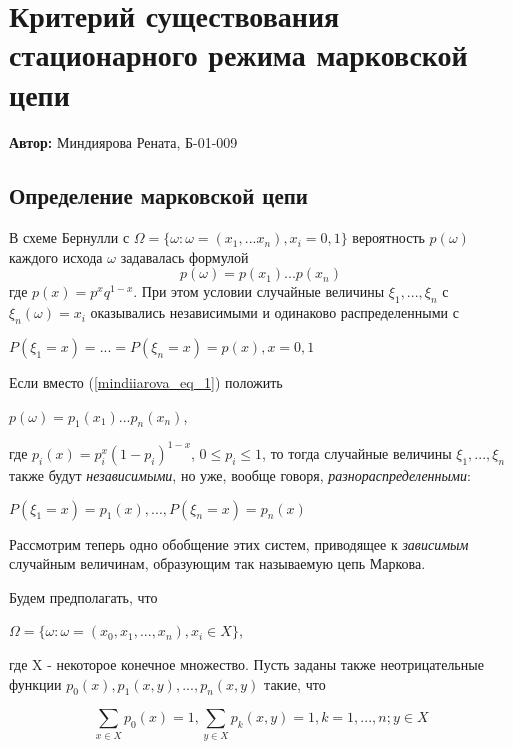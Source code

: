 \section{Критерий существования стационарного режима марковской цепи}

\textbf{Автор:} Миндиярова Рената, Б-01-009

\subsection{Определение марковской цепи}
     В схеме Бернулли с $\Omega = \{\omega: {\omega = (x_1, ... x_n), x_i=0,1}\}$   вероятность $p(\omega)$ каждого исхода $\omega$ задавалась формулой  
\begin{equation} \label{mindiiarova_eq_1} 
p(\omega) = p(x_1)...p (x_n)
\end{equation}
 где $p(x)=p^xq^{1-x}$. При этом условии случайные величины $ \xi_1, ...,\xi_n$ с $\xi_n(\omega)=x_i$ оказывались независимыми и одинаково распределенными с 
\begin{center}
$P(\xi_1 = x) = ... = P(\xi_n = x) = p(x), x = 0,1 $
\end{center}

Если вместо (\ref{mindiiarova_eq_1}) положить 
\begin{center}
$p(\omega) = p_1 (x_1)...p_n (x_n)$,
\end{center}

 где $p_i(x)=p^x_i(1-p_i)^{1-x}$, $0\leq	p_i\leq	1$, то тогда случайные величины $ \xi_1, ...,\xi_n$ также будут \textit{независимыми}, но уже, вообще говоря, \textit{разнораспределенными}:
\begin{center}
$P(\xi_1 = x) = p_1 (x), ..., P(\xi_n = x) = p_n (x)$
\end{center}

Рассмотрим теперь одно обобщение этих систем, приводящее к \textit{зависимым} случайным величинам, образующим так называемую цепь Маркова.


Будем предполагать, что
\begin{center}
$\Omega = \{ \omega: \omega = (x_0, x_1, ..., x_n), x_i \in X \} $,
\end{center}
где X - некоторое конечное множество. Пусть заданы также неотрицательные функции $p_0(x), p_1(x,y), ..., p_n(x,y)$ такие, что 

\begin{equation} \label{mindiiarova_eq_2} 
\sum\limits_{x \in X} p_0 (x) = 1,\sum\limits_{y \in X} p_k (x, y) = 1, k = 1, ..., n; y \in X
\end{equation}

